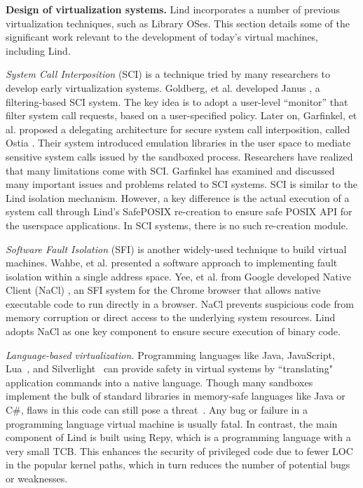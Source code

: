 
\textbf{Design of virtualization systems.}
Lind incorporates a number of previous virtualization techniques, such as Library OSes.
This section details some
of the significant work relevant to the development of today's virtual machines,
including Lind.

\textit{System Call Interposition} (SCI) is a technique tried by many researchers 
to develop early virtualization systems. 
Goldberg, et al. developed Janus \cite{Janus0:96, Janus:99}, a filtering-based SCI system. 
The key idea is to adopt a user-level ``monitor'' that filter system call requests, based on 
a user-specified policy. Later on, Garfinkel, et al. proposed a delegating architecture for secure system call interposition, 
called Ostia \cite{SCI-04}. Their system introduced emulation libraries in the user space 
to mediate sensitive system calls issued by the sandboxed process. 
Researchers have realized that many limitations come with SCI. 
Garfinkel has examined and discussed many important issues and problems \cite{Problems-SCI} related to SCI systems.
SCI is similar to the Lind isolation mechanism. However, a key difference is the actual execution
of a system call through Lind's SafePOSIX re-creation to ensure safe POSIX API for the userspace applications. 
In SCI systems, there is no such re-creation module. 

\textit{Software Fault Isolation} (SFI) is another widely-used technique 
to build virtual machines. 
Wahbe, et al. \cite{SFI:93} presented a software approach to implementing 
fault isolation within a single address space. 
Yee, et al. from Google developed Native Client (NaCl) \cite{NaCl-09}, 
an SFI system for the Chrome browser that allows native executable code to run directly in a
browser. NaCl prevents suspicious code
from memory corruption or direct access to the underlying system
resources. Lind adopts NaCl as one key component to ensure secure execution
of binary code.

\textit{Language-based virtualization.}
Programming languages like Java, JavaScript, Lua~\cite{Lua}, and
Silverlight~\cite{Silverlight} can provide safety in virtual systems by
``translating" application commands into a native language.
%
Though many sandboxes implement the bulk of standard libraries in
memory-safe languages like Java or C\#, flaws in this code can
still pose a threat~\cite{JavaBugs, Java-Lessons}.
Any bug or failure in a programming language virtual
machine is usually fatal. In contrast, the main component of Lind
is built using Repy, which is a programming language with a very small TCB.
This enhances the security of privileged code due to fewer LOC in the popular kernel paths, 
which in turn reduces the number of potential bugs or weaknesses.

